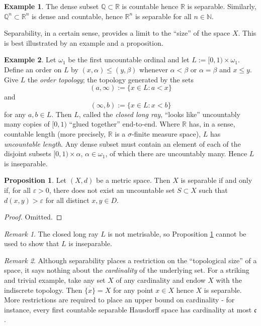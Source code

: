 \documentclass{book}
\theoremstyle{definition}
\newtheorem{proposition}{Proposition}[section]
\newtheorem{example}{Example}[section]
\theoremstyle{remark}
\newtheorem{remark}{Remark}[section]
\newcommand{\R}{\mathbb{R}}
\newcommand{\Q}{\mathbb{Q}}
\newcommand{\N}{\mathbb{N}}
\begin{document}
\begin{example}
The dense subset $\Q\subset\R$ is countable hence $\R$ is separable. Similarly, $\Q^n\subset\R^n$ is dense and countable, hence $\R^n$ is separable for all $n\in\N$.
\end{example}

Separability, in a certain sense, provides a limit to the ``size'' of the space $X$. This is best illustrated by an example and a proposition.

\begin{example}
\label{closedlongray}
Let $\omega_1$ be the first uncountable ordinal and let $L:=[0,1)\times\omega_1$. Define an order on $L$ by $(x,\alpha)\leq(y,\beta)$ whenever $\alpha<\beta$ or $\alpha=\beta$ and $x\leq y$. Give $L$ the \textit{order topology}; the topology generated by the sets
$$(a,\infty):=\{x\in L:a<x\}$$
and
$$(\infty,b):=\{x\in L:x<b\}$$
for any $a,b\in L$. Then $L$, called the \textit{closed long ray}, ``looks like'' uncountably many copies of $[0,1)$ ``glued together'' end-to-end. Where $\R$ has, in a sense, countable length (more precisely, $\R$ is a $\sigma$-finite measure space), $L$ has \textit{uncountable length}. Any dense subset must contain an element of each of the disjoint subsets $[0,1)\times\alpha$, $\alpha\in\omega_1$, of which there are uncountably many. Hence $L$ is inseparable.
\end{example}

\begin{proposition}
\label{metricspaceseparability}
Let $(X,d)$ be a metric space. Then $X$ is separable if and only if, for all $\varepsilon>0$, there does not exist an uncountable set $S\subset X$ such that $d(x,y)>\varepsilon$ for all distinct $x,y\in D$.
\end{proposition}
\begin{proof}
Omitted.
\end{proof}

\begin{remark}
The closed long ray $L$ is not metrisable, so Proposition \ref{metricspaceseparability} cannot be used to show that $L$ is inseparable.
\end{remark}

\begin{remark}
Although separability places a restriction on the ``topological size'' of a space, it says nothing about the \textit{cardinality} of the underlying set. For a striking and trivial example, take any set $X$ of any cardinality and endow $X$ with the indiscrete topology. Then $\overline{\{x\}}=X$ for any point $x\in X$ hence $X$ is separable. More restrictions are required to place an upper bound on cardinality - for instance, every first countable separable Hausdorff space has cardinality at most $\mathfrak{c}$.
\end{remark}
\end{document}
